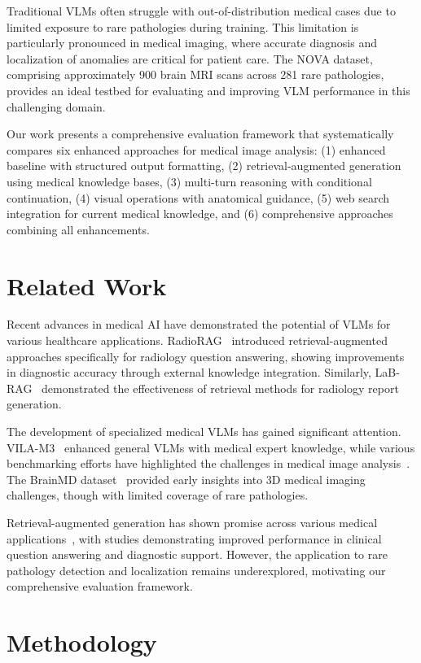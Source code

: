 \documentclass[runningheads]{llncs}
\begin{document}
Traditional VLMs often struggle with out-of-distribution medical cases due to limited exposure to rare pathologies during training. This limitation is particularly pronounced in medical imaging, where accurate diagnosis and localization of anomalies are critical for patient care. The NOVA dataset, comprising approximately 900 brain MRI scans across 281 rare pathologies, provides an ideal testbed for evaluating and improving VLM performance in this challenging domain.

Our work presents a comprehensive evaluation framework that systematically compares six enhanced approaches for medical image analysis: (1) enhanced baseline with structured output formatting, (2) retrieval-augmented generation using medical knowledge bases, (3) multi-turn reasoning with conditional continuation, (4) visual operations with anatomical guidance, (5) web search integration for current medical knowledge, and (6) comprehensive approaches combining all enhancements.

\section{Related Work}

Recent advances in medical AI have demonstrated the potential of VLMs for various healthcare applications. RadioRAG~\cite{radiorag2024} introduced retrieval-augmented approaches specifically for radiology question answering, showing improvements in diagnostic accuracy through external knowledge integration. Similarly, LaB-RAG~\cite{labrag2024} demonstrated the effectiveness of retrieval methods for radiology report generation.

The development of specialized medical VLMs has gained significant attention. VILA-M3~\cite{vilam32024} enhanced general VLMs with medical expert knowledge, while various benchmarking efforts have highlighted the challenges in medical image analysis~\cite{medicalvlm2024}. The BrainMD dataset~\cite{brainmd2024} provided early insights into 3D medical imaging challenges, though with limited coverage of rare pathologies.

Retrieval-augmented generation has shown promise across various medical applications~\cite{medicalrag2024}, with studies demonstrating improved performance in clinical question answering and diagnostic support. However, the application to rare pathology detection and localization remains underexplored, motivating our comprehensive evaluation framework.

\section{Methodology}
\end{document}
